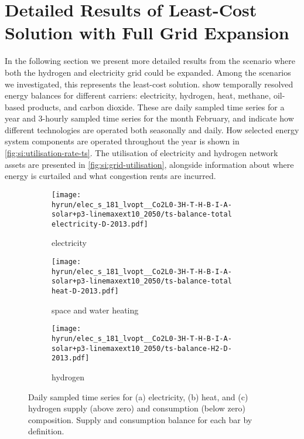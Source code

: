 

\section{Detailed Results of Least-Cost Solution with Full Grid Expansion}
\label{sec:si:detailed}

In the following section we present more detailed results from the scenario
where both the hydrogen and electricity grid could be expanded. Among the
scenarios we investigated, this represents the least-cost solution.
 show temporally resolved energy
balances for different carriers: electricity, hydrogen, heat, methane, oil-based
products, and carbon dioxide. These are daily sampled time series for a year and
3-hourly sampled time series for the month February, and indicate how different
technologies are operated both seasonally and daily. How selected energy system
components are operated throughout the year is shown in
\cref{fig:si:utilisation-rate-ts}. The utilisation of electricity and hydrogen
network assets are presented in \cref{fig:si:grid-utilisation}, alongside
information about where energy is curtailed and what congestion rents are
incurred.

\begin{figure}
    \centering

    \begin{subfigure}[t]{\textwidth}
        \centering
        \caption{electricity}
        \texttt{[image: \\hyrun/elec\_s\_181\_lvopt\_\_Co2L0-3H-T-H-B-I-A-solar+p3-linemaxext10\_2050/ts-balance-total electricity-D-2013.pdf]}
    \end{subfigure}
    \begin{subfigure}[t]{\textwidth}
        \centering
        \caption{space and water heating}
        \texttt{[image: \\hyrun/elec\_s\_181\_lvopt\_\_Co2L0-3H-T-H-B-I-A-solar+p3-linemaxext10\_2050/ts-balance-total heat-D-2013.pdf]}
    \end{subfigure}
    \begin{subfigure}[t]{\textwidth}
        \centering
        \caption{hydrogen}
        \texttt{[image: \\hyrun/elec\_s\_181\_lvopt\_\_Co2L0-3H-T-H-B-I-A-solar+p3-linemaxext10\_2050/ts-balance-H2-D-2013.pdf]}
    \end{subfigure}

    \caption{Daily sampled time series for (a) electricity, (b) heat, and (c) hydrogen supply (above zero) and consumption (below zero) composition. Supply and consumption balance for each bar by definition.}
    \label{fig:output-ts-1}
\end{figure}

